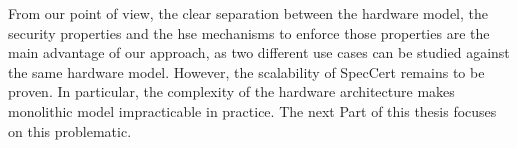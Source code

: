 From our point of view, the clear separation between the hardware model, the
security properties and the \ac{hse} mechanisms to enforce those properties are
the main advantage of our approach, as two different use cases can be studied
against the same hardware model.
%
However, the scalability of SpecCert remains to be proven.
%
In particular, the complexity of the hardware architecture makes monolithic
model impracticable in practice.
%
The next Part of this thesis focuses on this problematic.


